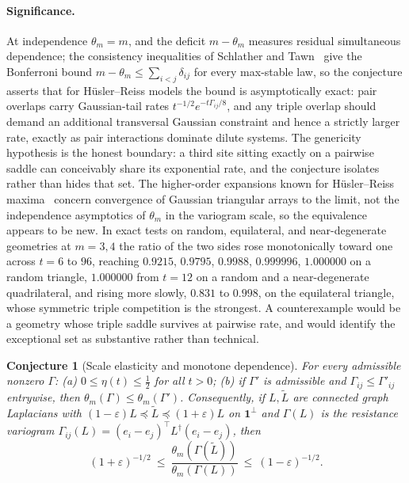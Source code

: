 \documentclass[11pt]{article}
\newtheorem{conjecture}{Conjecture}
\theoremstyle{definition}
\newcommand{\eps}{\varepsilon}
\begin{document}
\paragraph{Significance.}
At independence $\theta_m=m$, and the deficit $m-\theta_m$ measures residual simultaneous dependence; the consistency inequalities of Schlather and Tawn~\cite{ST02} give the Bonferroni bound $m-\theta_m\le\sum_{i<j}\delta_{ij}$ for every max-stable law, so the conjecture asserts that for H\"usler--Reiss models the bound is asymptotically exact: pair overlaps carry Gaussian-tail rates $t^{-1/2}e^{-t\Gamma_{ij}/8}$, and any triple overlap should demand an additional transversal Gaussian constraint and hence a strictly larger rate, exactly as pair interactions dominate dilute systems.  The genericity hypothesis is the honest boundary: a third site sitting exactly on a pairwise saddle can conceivably share its exponential rate, and the conjecture isolates rather than hides that set.  The higher-order expansions known for H\"usler--Reiss maxima~\cite{HPW16} concern convergence of Gaussian triangular arrays to the limit, not the independence asymptotics of $\theta_m$ in the variogram scale, so the equivalence appears to be new.  In exact tests on random, equilateral, and near-degenerate geometries at $m=3,4$ the ratio of the two sides rose monotonically toward one across $t=6$ to $96$, reaching $0.9215$, $0.9795$, $0.9988$, $0.999996$, $1.000000$ on a random triangle, $1.000000$ from $t=12$ on a random and a near-degenerate quadrilateral, and rising more slowly, $0.831$ to $0.998$, on the equilateral triangle, whose symmetric triple competition is the strongest.  A counterexample would be a geometry whose triple saddle survives at pairwise rate, and would identify the exceptional set as substantive rather than technical.

\begin{conjecture}[Scale elasticity and monotone dependence]\label{ah3}
For every admissible nonzero $\Gamma$: (a) $0\le\eta(t)\le\tfrac12$ for all $t>0$; (b) if $\Gamma'$ is admissible and $\Gamma_{ij}\le\Gamma'_{ij}$ entrywise, then $\theta_m(\Gamma)\le\theta_m(\Gamma')$.  Consequently, if $L,\widetilde L$ are connected graph Laplacians with $(1-\eps)L\preceq\widetilde L\preceq(1+\eps)L$ on $\mathbf 1^\perp$ and $\Gamma(L)$ is the resistance variogram $\Gamma_{ij}(L)=(e_i-e_j)^\top L^\dagger(e_i-e_j)$, then
\[
(1+\eps)^{-1/2}\ \le\ \frac{\theta_m(\Gamma(\widetilde L))}{\theta_m(\Gamma(L))}\ \le\ (1-\eps)^{-1/2}.
\]
\end{conjecture}
\end{document}
